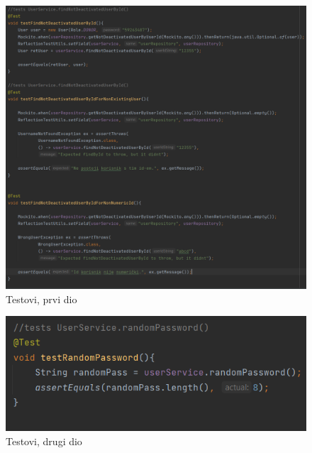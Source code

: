 			    \begin{figure}[H]
                    \includegraphics[scale=0.6]{slike/Tests/test1.png}
        			\centering
        			\caption{Testovi, prvi dio}
        			\label{fig:controller}
        		\end{figure}
        		\begin{figure}[H]
                    \includegraphics[scale=0.8]{slike/Tests/test2.png}
        			\centering
        			\caption{Testovi, drugi dio}
        			\label{fig:controller}
        		\end{figure}
